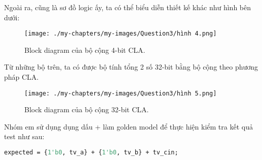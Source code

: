 Ngoài ra, cũng là sơ đồ logic ấy, ta có thể biểu diễn thiết kế khác như hình bên dưới:

\begin{figure}[H]
	\centering
	\texttt{[image: ./my-chapters/my-images/Question3/hình 4.png]}
	\caption{Block diagram của bộ cộng 4-bit CLA.}
\end{figure}

Từ những bộ trên, ta có được bộ tính tổng 2 số 32-bit bằng bộ cộng theo phương pháp CLA.

\begin{figure}[H]
	\centering
	\texttt{[image: ./my-chapters/my-images/Question3/hình 5.png]}
	\caption{Block diagram của bộ cộng 32-bit CLA.}
\end{figure}







Nhóm em sử dụng dụng dấu \textsf{+} làm golden model để thực hiện kiểm tra kết quả test như sau:

\begin{lstlisting}[style=StyleCode, language=SystemVerilog, caption={Giải thuật chứng minh kết quả của bộ cộng CLA 32-bit.}]
	expected = {1'b0, tv_a} + {1'b0, tv_b} + tv_cin;
\end{lstlisting}

